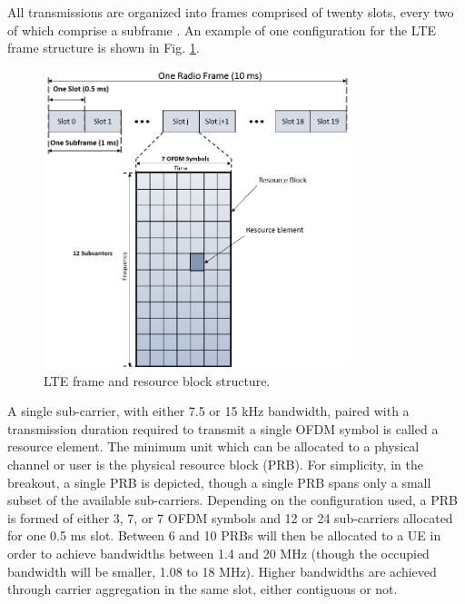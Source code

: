 All transmissions are organized into frames comprised of twenty slots, every two of which comprise a subframe \cite{tr36211}. An example of one configuration for the LTE frame structure is shown in Fig. \ref{lte:frame}.
\begin{figure}[!t]
	\centering
	\includegraphics[width=0.8\textwidth]{figs/LTE-frame}
	\caption{LTE frame and resource block structure.}
	\label{lte:frame}
\end{figure}
A single sub-carrier, with either 7.5 or 15 kHz bandwidth, paired with a transmission duration required to transmit a single OFDM symbol is called a resource element.  The minimum unit which can be allocated to a physical channel or user is the physical resource block (PRB).  For simplicity, in the breakout, a single PRB is depicted, though a single PRB spans only a small subset of the available sub-carriers. Depending on the configuration used, a PRB is formed of either 3, 7, or 7 OFDM symbols and 12 or 24 sub-carriers allocated for one 0.5 ms slot.  Between 6 and 10 PRBs will then be allocated to a UE in order to achieve bandwidths between 1.4 and 20 MHz (though the occupied bandwidth will be smaller, 1.08 to 18 MHz).  Higher bandwidths are achieved through carrier aggregation in the same slot, either contiguous or not. 

